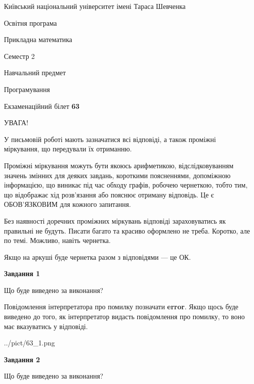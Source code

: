 \documentclass[12pt, ukrainian]{article}
\begin{document}
{{\begin {small}\par
{ \center  Київський національний університет імені Тараса Шевченка \par}
{\parbox {5 cm}{Освітня програма \hfill}{\parbox {7 cm}{Прикладна математика \hfill}}\parbox {6 cm}{\hfill Семестр 2}}\par
{\parbox {5 cm} {Навчальний предмет \hfill}\parbox {7 cm}{Програмування \hfill}\parbox {6cm}{\hfill}\par}\vspace{-7pt} \end{small}}{\center Екзаменаційний білет \No \textbf
{ 63 }\par}}
{
\begin {large}
УВАГА!

У письмовій роботі мають зазначатися всі відповіді, а також проміжні міркування, що передували їх отриманню.

Проміжні міркування можуть бути якоюсь арифметикою, відслідковуванням зна\-чень змінних для деяких завдань,
короткими поясненнями, допоміжною інформацією, що виникає під час обходу графів, робочею чернеткою,
тобто тим, що відображає хід розв’язання або пояснює отриману відповідь.
Це є ОБОВ’ЯЗКОВИМ для кожного запитання.

Без наявності доречних проміжних міркувань відповіді зараховуватись як правиль\-ні не будуть.
Писати багато та красиво оформлено не треба. Коротко, але по темі. Можли\-во, навіть чернетка.

Якщо на аркуші буде чернетка разом з відповідями --- це ОК.

\newpage

{\begin {center}\textbf{Завдання 1}\end {center}}\par
Що буде виведено за виконання?

Повідомлення інтерпретатора про помилку позначати \textbf{error}.
Якщо щось буде виведено до того, як інтерпретатор видасть повідомлення про помилку, 
то воно має вказуватись у відповіді. \par


\begin{center}
	{../pict/63_1.png}
\end{center}
\newpage

{\begin {center}\textbf{Завдання 2}\end {center}}\par
Що буде виведено за виконання?


\end{large}}
\end{document}
